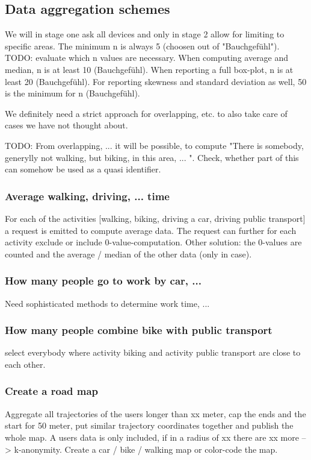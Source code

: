 \subsection{Data aggregation schemes}
We will in stage one ask all devices and only in stage 2 allow for limiting to specific areas. The minimum n is always 5 (choosen out of "Bauchgefühl").
TODO: evaluate which n values are necessary.
When computing average and median, n is at least 10 (Bauchgefühl).
When reporting a full box-plot, n is at least 20 (Bauchgefühl). 
For reporting skewness and standard deviation as well, 50 is the minimum for n (Bauchgefühl).

We definitely need a strict approach for overlapping, etc. to also take care of cases we have not thought about.

TODO: From overlapping, ... it will be possible, to compute "There is somebody, generylly not walking, but biking, in this area, ... ". Check, whether part of this can somehow be used as a quasi identifier.
\subsubsection{Average walking, driving, ... time}
For each of the activities [walking, biking, driving a car, driving public transport] a request is emitted to compute average data.
The request can further for each activity exclude or include 0-value-computation. Other solution: the 0-values are counted and the average / median of the other data (only in case).
\subsubsection{How many people go to work by car, ...}
Need sophisticated methods to determine work time, ... 
\subsubsection{How many people combine bike with public transport}
select everybody where activity biking and activity public transport are close to each other.
\subsubsection{Create a road map}
Aggregate all trajectories of the users longer than xx meter, cap the ends and the start for 50 meter, put similar trajectory coordinates together and publish the whole map.
A users data is only included, if in a radius of xx there are xx more --> k-anonymity.
Create a car / bike / walking map or color-code the map.
